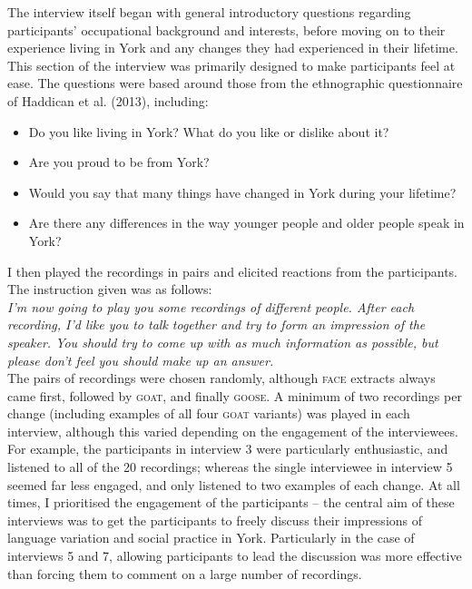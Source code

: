 \documentclass{article}
\begin{document}
The interview itself began with general introductory questions regarding participants' occupational background and interests, before moving on to their experience living in York and any changes they had experienced in their lifetime. This section of the interview was primarily designed to make participants feel at ease. The questions were based around those from the ethnographic questionnaire of Haddican et al. (2013), including:

\begin{itemize}
\item{Do you like living in York? What do you like or dislike about it?}
\item{Are you proud to be from York?}
\item{Would you say that many things have changed in York during your lifetime? }
\item{Are there any differences in the way younger people and older people speak in York?}
\end{itemize}

 I then played the recordings in pairs and elicited reactions from the participants. The instruction given was as follows:\\

 \textit{I'm now going to play you some recordings of different people. After each recording, I'd like you to talk together and try to form an impression of the speaker. You should try to come up with as much information as possible, but please don't feel you should make up an answer.}
 \\

The pairs of recordings were chosen randomly, although \textsc{face} extracts always came first, followed by \textsc{goat}, and finally \textsc{goose}. A minimum of two recordings per change (including examples of all four \textsc{goat} variants) was played in each interview, although this varied depending on the engagement of the interviewees. For example, the participants in interview 3 were particularly enthusiastic, and listened to all of the 20 recordings; whereas the single interviewee in interview 5 seemed far less engaged, and only listened to two examples of each change. At all times, I prioritised the engagement of the participants -- the central aim of these interviews was to get the participants to freely discuss their impressions of language variation and social practice in York. Particularly in the case of interviews 5 and 7, allowing participants to lead the discussion was more effective than forcing them to comment on a large number of recordings. 
\end{document}
